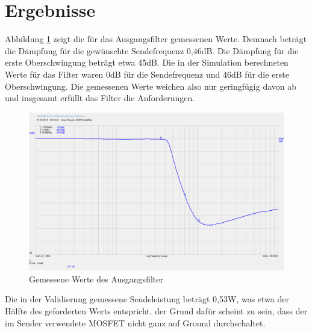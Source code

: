 \section{Ergebnisse}
Abbildung \ref{filter} zeigt die für das Ausgangsfilter gemessenen Werte. Demnach beträgt die Dämpfung für die gewünschte Sendefrequenz 0,46dB. Die Dämpfung für die erste Oberschwingung beträgt etwa 45dB. Die in der Simulation berechneten Werte für das Filter waren 0dB für die Sendefrequenz und 46dB für die erste Oberschwingung. Die gemessenen Werte weichen also nur geringfügig davon ab und insgesamt erfüllt das Filter die Anforderungen.\\
\begin{figure}[H]\centering
	\includegraphics[width=16cm]{res/Filterwerte.png}
	\caption{Gemessene Werte des Ausgangsfilter}
	\label{filter}
\end{figure}

Die in der Validierung gemessene Sendeleistung beträgt 0,53W, was etwa der Hälfte des geforderten Werts entspricht. der Grund dafür scheint zu sein, dass der im Sender verwendete MOSFET nicht ganz auf Ground durchschaltet.
